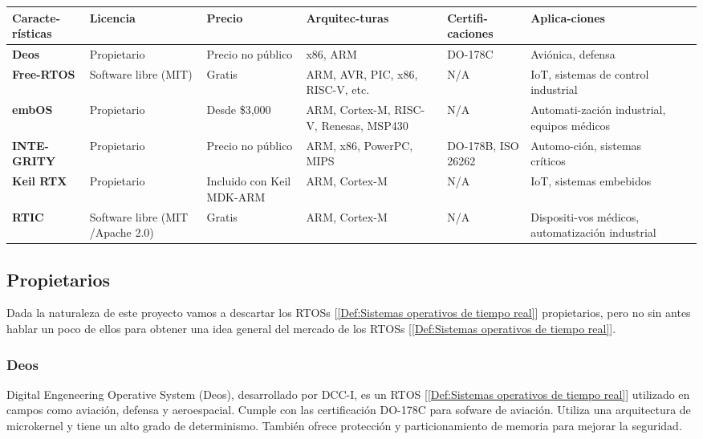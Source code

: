 \begin{table}[h]
\centering
\renewcommand{\arraystretch}{1.5}
\begin{tabularx}{\textwidth}{|X|X|X|X|X|X|X|}
\hline
\textbf{Caracte-rísticas}	&  \textbf{Licencia}						& \textbf{Precio}		 & \textbf{Arquitec-turas}			& \textbf{Certifi-caciones}	& \textbf{Aplica-ciones} \\ \hline
\textbf{Deos}			&  \cellcolor{red!33}Propietario				& Precio no público		 & x86, ARM					& DO-178C			& Aviónica, defensa \\ \hline
\textbf{Free-RTOS}		&  \cellcolor{green!33}Software libre (MIT)			& Gratis			 & ARM, AVR, PIC, x86, RISC-V, etc.		& N/A				& IoT, sistemas de control industrial \\ \hline
\textbf{embOS}			&  \cellcolor{red!33}Propietario				& Desde \$3,000			 & ARM, Cortex-M, RISC-V, Renesas, MSP430	& N/A				& Automati-zación industrial, equipos médicos \\ \hline
\textbf{INTE-GRITY}		&  \cellcolor{red!33}Propietario				& Precio no público		 & ARM, x86, PowerPC, MIPS			& DO-178B, ISO 26262		& Automo-ción, sistemas críticos \\ \hline
\textbf{Keil RTX}		&  \cellcolor{red!33}Propietario				& Incluido con Keil MDK-ARM	 & ARM, Cortex-M				& N/A				& IoT, sistemas embebidos \\ \hline
\textbf{RTIC}			&  \cellcolor{green!33}Software libre (MIT /Apache 2.0)		& Gratis			 & ARM, Cortex-M				& N/A				& Dispositi-vos médicos, automatización industrial \\ \hline
\end{tabularx}
\label{tab:Comparativa de sistemas operativos de tiempo real}
\end{table}

\subsection{Propietarios}
Dada la naturaleza de este proyecto vamos a descartar los RTOSs [\ref{Def:Sistemas operativos de tiempo real}] propietarios, pero no sin antes hablar un poco de ellos para obtener una idea general del mercado de los RTOSs [\ref{Def:Sistemas operativos de tiempo real}].

\subsubsection{Deos}
Digital Engeneering Operative System (Deos), desarrollado por DCC-I, es un RTOS [\ref{Def:Sistemas operativos de tiempo real}] utilizado en campos como aviación, defensa y aeroespacial. Cumple con las certificación DO-178C para sofware de aviación. Utiliza una arquitectura de microkernel y tiene un alto grado de determinismo. También ofrece protección y particionamiento de memoria para mejorar la seguridad.

